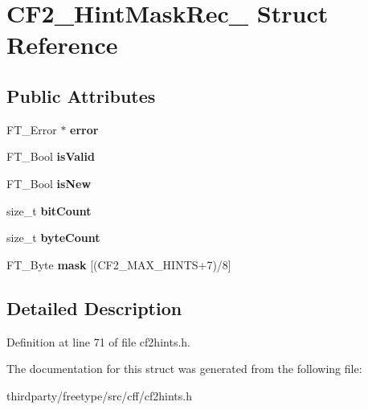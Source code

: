 \hypertarget{struct_c_f2___hint_mask_rec__}{}\section{C\+F2\+\_\+\+Hint\+Mask\+Rec\+\_\+ Struct Reference}
\label{struct_c_f2___hint_mask_rec__}
\subsection*{Public Attributes}
\begin{DoxyCompactItemize}
\item 
\mbox{\label{struct_c_f2___hint_mask_rec___a7943c5df02381c4544e88c7a25d95c8a}} 
F\+T\+\_\+\+Error $\ast$ {\bfseries error}
\item 
\mbox{\label{struct_c_f2___hint_mask_rec___a90b470e87a8133475f9917cec37c3119}} 
F\+T\+\_\+\+Bool {\bfseries is\+Valid}
\item 
\mbox{\label{struct_c_f2___hint_mask_rec___a29e9bee8e7660f1dcee71b16a55b5bfe}} 
F\+T\+\_\+\+Bool {\bfseries is\+New}
\item 
\mbox{\label{struct_c_f2___hint_mask_rec___ad4bd9a866e457bef3650b7dda81e81bd}} 
size\+\_\+t {\bfseries bit\+Count}
\item 
\mbox{\label{struct_c_f2___hint_mask_rec___a610d244e7207eae85e7bafd40b73b713}} 
size\+\_\+t {\bfseries byte\+Count}
\item 
\mbox{\label{struct_c_f2___hint_mask_rec___afff8109d9b145207de059a0b9b3016ef}} 
F\+T\+\_\+\+Byte {\bfseries mask} \mbox{[}(C\+F2\+\_\+\+M\+A\+X\+\_\+\+H\+I\+N\+TS+7)/8\mbox{]}
\end{DoxyCompactItemize}


\subsection{Detailed Description}


Definition at line 71 of file cf2hints.\+h.



The documentation for this struct was generated from the following file\+:\begin{DoxyCompactItemize}
\item 
thirdparty/freetype/src/cff/cf2hints.\+h\end{DoxyCompactItemize}
